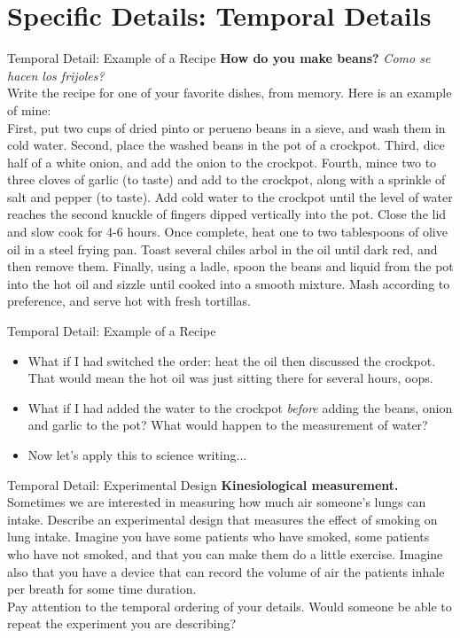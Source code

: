 \documentclass{beamer}
\begin{document}
\section{Specific Details: Temporal Details}

\begin{frame}{Temporal Detail: Example of a Recipe}
\small
\textbf{How do you make beans?} \textit{Como se hacen los frijoles?} \\ \vspace{0.25cm}
\alert{Write the recipe for one of your favorite dishes, from memory}.  Here is an example of mine: \\ \vspace{0.25cm}
First, put two cups of dried pinto or perueno beans in a sieve, and wash them in cold water.  Second, place the washed beans in the pot of a crockpot.  Third, dice half of a white onion, and add the onion to the crockpot.  Fourth, mince two to three cloves of garlic (to taste) and add to the crockpot, along with a sprinkle of salt and pepper (to taste).  Add cold water to the crockpot until the level of water reaches the second knuckle of fingers dipped vertically into the pot.  Close the lid and slow cook for 4-6 hours.  Once complete, heat one to two tablespoons of olive oil in a steel frying pan.  Toast several chiles arbol in the oil until dark red, and then remove them.  Finally, using a ladle, spoon the beans and liquid from the pot into the hot oil and sizzle until cooked into a smooth mixture.  Mash according to preference, and serve hot with fresh tortillas.
\end{frame}

\begin{frame}{Temporal Detail: Example of a Recipe}
\begin{itemize}
\item What if I had switched the order: heat the oil then discussed the crockpot.  That would mean the hot oil was just sitting there for several hours, oops.
\item What if I had added the water to the crockpot \textit{before} adding the beans, onion and garlic to the pot?  What would happen to the measurement of water?
\item Now let's apply this to science writing...
\end{itemize}
\end{frame}

\begin{frame}{Temporal Detail: Experimental Design}
\textbf{Kinesiological measurement.} Sometimes we are interested in measuring how much air someone's lungs can intake.  Describe an experimental design that measures the effect of smoking on lung intake.  Imagine you have some patients who have smoked, some patients who have not smoked, and that you can make them do a little exercise.  Imagine also that you have a device that can record the volume of air the patients inhale per breath for some time duration. \\ \vspace{0.5cm}
\alert{Pay attention to the temporal ordering of your details.  Would someone be able to repeat the experiment you are describing?}
\end{frame}
\end{document}
